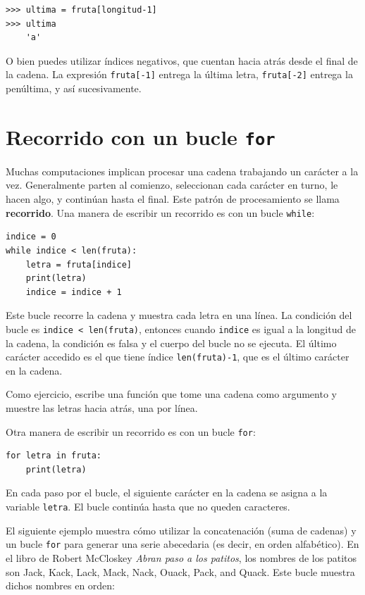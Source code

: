 \documentclass[10pt]{book}
\begin{document}
\begin{verbatim}
>>> ultima = fruta[longitud-1]
>>> ultima
    'a'
\end{verbatim}
%
O bien puedes utilizar índices negativos, que cuentan hacia atrás desde
el final de la cadena.  La expresión {\tt fruta[-1]} entrega la última
letra, {\tt fruta[-2]} entrega la penúltima, y así sucesivamente.


\section{Recorrido con un bucle {\tt for}}
\label{for}

Muchas computaciones implican procesar una cadena trabajando un carácter a la
vez.  Generalmente parten al comienzo, seleccionan cada carácter en
turno, le hacen algo, y continúan hasta el final.  Este patrón de
procesamiento se llama {\bf recorrido}.  Una manera de escribir un recorrido
es con un bucle {\tt while}:

\begin{verbatim}
indice = 0
while indice < len(fruta):
    letra = fruta[indice]
    print(letra)
    indice = indice + 1
\end{verbatim}
%
Este bucle recorre la cadena y muestra cada letra en una
línea.  La condición del bucle es {\tt indice < len(fruta)}, entonces
cuando {\tt indice} es igual a la longitud de la cadena, la
condición es falsa y el cuerpo del bucle no se ejecuta.  El
último carácter accedido es el que tiene índice {\tt len(fruta)-1},
que es el último carácter en la cadena.

Como ejercicio, escribe una función que tome una cadena como argumento
y muestre las letras hacia atrás, una por línea.

Otra manera de escribir un recorrido es con un bucle {\tt for}:

\begin{verbatim}
for letra in fruta:
    print(letra)
\end{verbatim}
%
En cada paso por el bucle, el siguiente carácter en la cadena se asigna
a la variable {\tt letra}.  El bucle continúa hasta que no queden
caracteres.

El siguiente ejemplo muestra cómo utilizar la concatenación (suma de cadenas)
y un bucle {\tt for} para generar una serie abecedaria (es decir, en
orden alfabético).  En el libro de Robert McCloskey {\em Abran
paso a los patitos}, los nombres de los patitos son Jack, Kack, Lack,
Mack, Nack, Ouack, Pack, and Quack.  Este bucle muestra dichos nombres en
orden:
\end{document}
